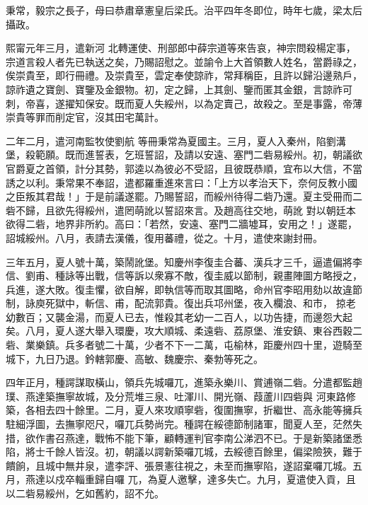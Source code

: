 
\begin{pinyinscope}

 秉常，毅宗之長子，母曰恭肅章憲皇后梁氏。治平四年冬即位，時年七歲，梁太后攝政。



 熙甯元年三月，遣新河
 北轉運使、刑部郎中薛宗道等來告哀，神宗問殺楊定事，宗道言殺人者先已執送之矣，乃賜詔慰之。並諭令上大首領數人姓名，當爵祿之，俟崇貴至，即行冊禮。及崇貴至，雲定奉使諒祚，常拜稱臣，且許以歸沿邊熟戶，諒祚遺之寶劍、寶鑒及金銀物。初，定之歸，上其劍、鑒而匿其金銀，言諒祚可刺，帝喜，遂擢知保安。既而夏人失綏州，以為定賣己，故殺之。至是事露，帝薄崇貴等罪而削定官，沒其田宅萬計。



 二年二月，遣河南監牧使劉航
 等冊秉常為夏國主。三月，夏人入秦州，陷劉溝堡，殺範願。既而進誓表，乞班誓詔，及請以安遠、塞門二砦易綏州。初，朝議欲官爵夏之首領，計分其勢，郭逵以為彼必不受詔，且彼既恭順，宜布以大信，不當誘之以利。秉常果不奉詔，遣都羅重進來言曰：「上方以孝治天下，奈何反教小國之臣叛其君哉！」于是前議遂罷。乃賜誓詔，而綏州待得二砦乃還。夏主受冊而二砦不歸，且欲先得綏州，遣罔萌訛以誓詔來言。及趙高往交地，萌訛
 對以朝廷本欲得二砦，地界非所約。高曰：「若然，安遠、塞門二牆墟耳，安用之！」遂罷，詔城綏州。八月，表請去漢儀，復用蕃禮，從之。十月，遣使來謝封冊。



 三年五月，夏人號十萬，築鬧訛堡。知慶州李復圭合蕃、漢兵才三千，逼遣偏將李信、劉甫、種詠等出戰，信等訴以衆寡不敵，復圭威以節制，親畫陣圖方略授之，兵進，遂大敗。復圭懼，欲自解，即執信等而取其圖略，命州官李昭用劾以故違節制，詠庾死獄中，斬信、甫，配流郭貴。復出兵邛州堡，夜入欄浪、和市，
 掠老幼數百；又襲金湯，而夏人已去，惟殺其老幼一二百人，以功告捷，而邊怨大起矣。八月，夏人遂大舉入環慶，攻大順城、柔遠砦、荔原堡、淮安鎮、東谷西穀二砦、業樂鎮。兵多者號二十萬，少者不下一二萬，屯榆林，距慶州四十里，遊騎至城下，九日乃退。鈐轄郭慶、高敏、魏慶宗、秦勃等死之。



 四年正月，種諤謀取橫山，領兵先城囉兀，進築永樂川、賞逋嶺二砦。分遣都監趙璞、燕達築撫寧故城，及分荒堆三泉、吐渾川、開光嶺、葭蘆川四砦與
 河東路修築，各相去四十餘里。二月，夏人來攻順寧砦，復圍撫寧，折繼世、高永能等擁兵駐細浮圖，去撫寧咫尺，囉兀兵勢尚完。種諤在綏德節制諸軍，聞夏人至，茫然失措，欲作書召燕達，戰怖不能下筆，顧轉運判官李南公涕泗不已。于是新築諸堡悉陷，將士千餘人皆沒。初，朝議以諤新築囉兀城，去綏德百餘里，偏梁險狹，難于饋餉，且城中無井泉，遣李評、張景憲往視之，未至而撫寧陷，遂詔棄囉兀城。五月，燕達以戍卒輜重歸自囉
 兀，為夏人邀擊，達多失亡。九月，夏遣使入貢，且以二砦易綏州，乞如舊約，詔不允。




\end{pinyinscope}
